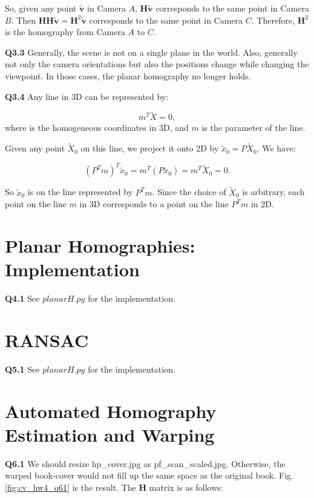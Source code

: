 \documentclass[
  course = {{16-720B Computer Vision}},
  quartile = {{1}},
  assignment = 4\ -\ Feature\ Descriptors\ \&\ Homographies\ \& \  RANSAC,
  name = {{Kangle Deng}},
  email = {{kangled@andrew.cmu.edu}},
  firstexercise = 1
]{aga-homework}
\begin{document}
So, given any point $\tilde{\mathbf{v}}$ in Camera $A$, $\mathbf{H}\tilde{\mathbf{v}}$ corresponds to the same point in Camera $B$. Then $\mathbf{H}\mathbf{H}\tilde{\mathbf{v}} = \mathbf{H}^2\tilde{\mathbf{v}}$ corresponds to the same point in Camera $C$. Therefore, $\mathbf{H}^2$ is the homography from Camera $A$ to $C$.

\noindent \textbf{Q3.3} Generally, the scene is not on a single plane in the world. Also, generally not only the camera orientations but also the positions change while changing the viewpoint. In those cases, the planar homography no longer holds.

\noindent \textbf{Q3.4} Any line in 3D can be represented by:

\begin{equation*}
    m^T\tilde{X} = 0,
\end{equation*}
where  is the homogeneous coordinates in 3D, and $m$ is the parameter of the line.

Given any point $\tilde{X}_0$ on this line, we project it onto 2D by $\tilde{x}_0 = P\tilde{X}_0$. We have:

\begin{equation*}
    (P^Tm)^T\tilde{x}_0 = m^T(P\tilde{x}_0) = m^T\tilde{X}_0 = 0.
\end{equation*}

So $\tilde{x}_0$ is on the line represented by $P^Tm$. Since the choice of $\tilde{X}_0$ is arbitrary, each point on the line $m$ in 3D corresponds to a point on the line $P^Tm$ in 2D.

\section{Planar Homographies: Implementation}

\noindent\textbf{Q4.1} See $planarH.py$ for the implementation.

\section{RANSAC}

\noindent\textbf{Q5.1} See $planarH.py$ for the implementation.

\section{Automated Homography Estimation and Warping}

\noindent \textbf{Q6.1} We should resize hp\_cover.jpg as pf\_scan\_scaled.jpg. Otherwise, the warped book-cover would not fill up the same space as the original book. Fig. \ref{fig:cv_hw4_q61} is the result. The $\mathbf{H}$ matrix is as follows:
\end{document}

